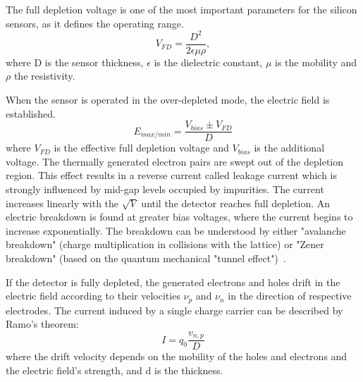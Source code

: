 The full depletion voltage is one of the most important parameters for the silicon sensors, as it defines the operating range. 
\begin{equation}
    V_{FD} = \frac{D^{2}}{2\epsilon \mu \rho},
\end{equation}
where D is the sensor thickness, $\epsilon$ is the dielectric constant, $\mu$ is the mobility and $\rho$ the resistivity.

When the sensor is operated in the over-depleted mode, the electric field is established.
\begin{equation}
    E_{max/min} = \frac{V_{bias}\pm V_{FD}}{D}
\end{equation}
where $V_{FD}$ is the effective full depletion voltage and $V_{bias}$ is the additional voltage. The thermally generated electron pairs are swept out of the depletion region. This effect results in a reverse current called leakage current which is strongly influenced by mid-gap levels occupied by impurities. The current increases linearly with the $\sqrt{V}$ until the detector reaches full depletion. An electric breakdown is found at greater bias voltages, where the current begins to increase exponentially. The breakdown can be understood by either "avalanche breakdown" (charge multiplication in collisions with the lattice) or "Zener breakdown" (based on the quantum mechanical "tunnel effect")~\cite{Hartmann:2017gzy}.

If the detector is fully depleted, the generated electrons and holes drift in the electric field according to their velocities $\nu_{p}$ and $\nu_{n}$ in the direction of respective electrodes. The current induced by a single charge carrier can be described by Ramo's theorem:
\begin{equation}
    I = q_{0}\frac{v_{n,p}}{D}
\end{equation}
where the drift velocity depends on the mobility of the holes and electrons and the electric field's strength, and d is the thickness.

